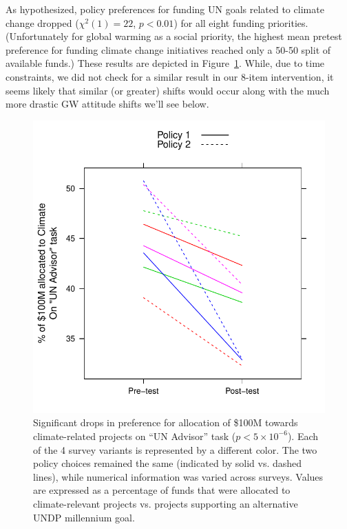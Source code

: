 As hypothesized, policy preferences for funding UN goals related to climate
change dropped ($\chi^2(1)=22$, $p<0.01$) for all eight funding priorities.
(Unfortunately for global warming as a social priority, the highest mean
pretest preference for funding climate change initiatives reached only a 50-50
split of available funds.) These results are depicted in
Figure~\ref{fig:evil-alloc}. While, due to time constraints, we did not check
for a similar result in our 8-item intervention, it seems likely that similar
(or greater) shifts would occur along with the much more drastic GW attitude
shifts we'll see below.

\begin{figure}
    \centering
    \includegraphics{evil-alloc.pdf}
    \caption{Significant drops in preference for allocation of \$100M towards
        climate-related projects on “UN Advisor” task ($p<5\times10^{-6}$). Each
        of the 4 survey variants is represented by a different color. The two
        policy choices remained the same (indicated by solid vs. dashed lines),
        while numerical information was varied across surveys. Values are
        expressed as a percentage of funds that were allocated to
        climate-relevant projects vs. projects supporting an alternative UNDP
        millennium goal.}
    \label{fig:evil-alloc}
\end{figure}

